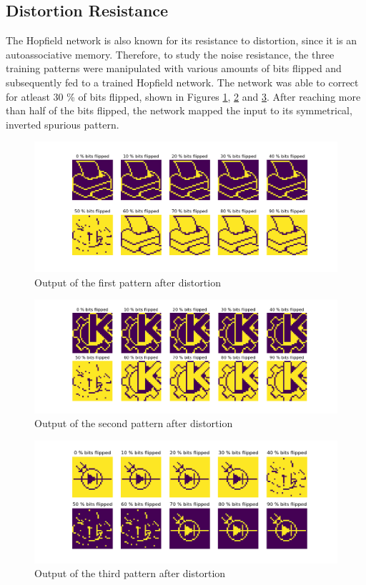 \documentclass[a4paper]{article}
\begin{document}
\subsection{Distortion Resistance}
The Hopfield network is also known for its resistance to distortion, since it is an autoassociative memory. Therefore, to study the noise resistance, the three training patterns were manipulated with various amounts of bits flipped and subsequently fed to a trained Hopfield network. The network was able to correct for atleast 30 \% of bits flipped, shown in Figures \ref{fig:dist1}, \ref{fig:dist2} and \ref{fig:dist3}. After reaching more than half of the bits flipped, the network mapped the input to its symmetrical, inverted spurious pattern.
\begin{figure}[ht]
   \centering
   \includegraphics[width=\linewidth]{figures/d1.png}
   \caption{Output of the first pattern after distortion}
   \label{fig:dist1}
\end{figure}
\begin{figure}[ht]
   \centering
   \includegraphics[width=\linewidth]{figures/d2.png}
   \caption{Output of the second pattern after distortion}
   \label{fig:dist2}
\end{figure}
\begin{figure}[ht]
   \centering
   \includegraphics[width=\linewidth]{figures/d3.png}
   \caption{Output of the third pattern after distortion}
   \label{fig:dist3}
\end{figure}
\end{document}
